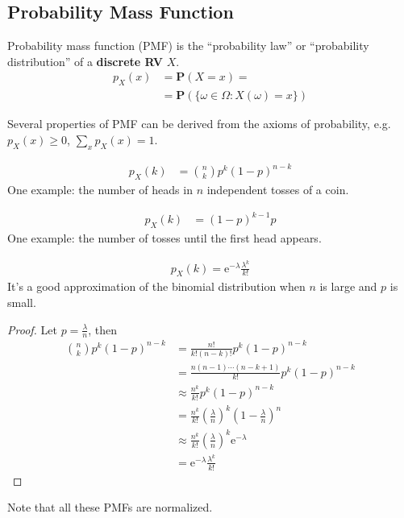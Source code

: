 \documentclass[device=normal, lang=en, fontsize=12pt]{elegantnote}
\numberwithin{equation}{section}
\theoremstyle{definition} %
\begin{document}
\subsection{Probability Mass Function}
\begin{definition}
    Probability mass function (PMF) is the ``probability law'' or ``probability distribution'' of a \textbf{discrete RV} $X$.
    \begin{align}
        p_{X}(x) &= \mathbf{P}(X = x) = \\ 
                 &= \mathbf{P}(\{\omega \in \varOmega: X(\omega) = x\})
    \end{align}
\end{definition}
Several properties of PMF can be derived from the axioms of probability, e.g. $p_{X}(x) \geq 0$, $\sum_{x} p_{X}(x) = 1$.
\begin{example}
    \begin{align}
        p_{X}(k) &= \binom{n}{k} p^{k} (1-p)^{n-k}
    \end{align}
    One example: the number of heads in $n$ independent tosses of a coin.
\end{example}
\begin{example}
    \begin{align}
        p_{X}(k) &= (1-p)^{k-1} p
    \end{align}
    One example: the number of tosses until the first head appears.
\end{example}
\begin{example}
    \begin{align}
        p_{X}(k) = \mathrm{e}^{-\lambda} \frac{\lambda^{k}}{k!}
    \end{align}
    It's a good approximation of the binomial distribution when $n$ is large and $p$ is small.
    \begin{proof}
        Let $p = \frac{\lambda}{n}$, then
        \begin{align}
            \binom{n}{k} p^{k} (1-p)^{n-k} &= \frac{n!}{k!(n-k)!} p^{k} (1-p)^{n-k} \\
            &= \frac{n(n-1)\cdots(n-k+1)}{k!} p^{k} (1-p)^{n-k} \\
            &\approx \frac{n^{k}}{k!} p^{k} (1-p)^{n-k} \\
            &= \frac{n^{k}}{k!} \left(\frac{\lambda}{n}\right)^{k} \left(1-\frac{\lambda}{n}\right)^{n} \\
            &\approx \frac{n^{k}}{k!} \left(\frac{\lambda}{n}\right)^{k} \mathrm{e}^{-\lambda} \\
            &= \mathrm{e}^{-\lambda} \frac{\lambda^{k}}{k!}
        \end{align}
    \end{proof}
\end{example}
Note that all these PMFs are normalized.
\end{document}
